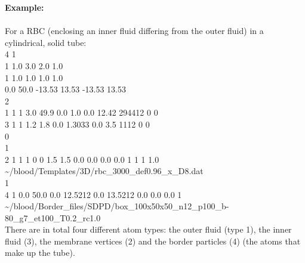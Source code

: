 \documentclass[a4paper,10pt]{scrreprt}
\begin{document}
\textbf{Example:}\\ \\
For a RBC (enclosing an inner fluid differing from the outer fluid) in a cylindrical, solid tube:\\
4 1\\
1 1.0 3.0 2.0 1.0\\
1 1.0 1.0 1.0 1.0\\
0.0 50.0 -13.53 13.53 -13.53 13.53\\
2\\
1 1 1 3.0 49.9 0.0 1.0 0.0 12.42 294412 0 0\\
3 1 1 1.2 1.8 0.0 1.3033 0.0 3.5 1112 0 0\\
0\\
1\\
2 1 1 1 0 0 1.5 1.5 0.0 0.0 0.0 0.0 1 1 1 1.0 \~{}/blood/Templates/3D/rbc\_3000\_def0.96\_x\_D8.dat\\
1\\
4 1 0.0 50.0 0.0 12.5212 0.0 13.5212 0.0 0.0 0.0 1 \~{}/blood/Border\_files/SDPD/box\_100x50x50\_n12\_p100\_b-80\_g7\_et100\_T0.2\_rc1.0\\

There are in total four different atom types: the outer fluid (type 1), the inner fluid (3), the membrane vertices (2) and the border particles (4) (the atoms that make up the tube).\\
\end{document}
